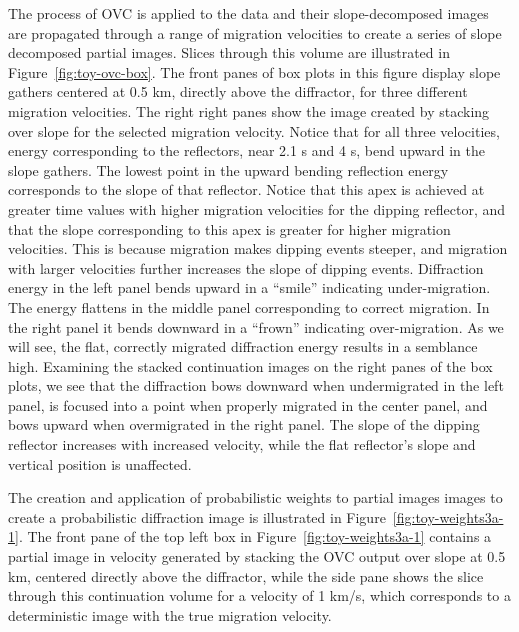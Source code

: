 The process of OVC is applied to the data and their slope-decomposed images are propagated through a range of migration velocities to create a series of slope decomposed partial images.
 Slices through this volume are illustrated in  Figure~\ref{fig:toy-ovc-box}. The front panes of box plots in this figure display slope gathers centered at 0.5 km, directly above the diffractor, for three different migration velocities.
The right right panes show the image created by stacking over slope for the selected migration velocity.   
Notice that for all three velocities, energy corresponding to the reflectors, near 2.1 s and 4 s, bend upward in the slope gathers.  The lowest point in the upward bending reflection energy corresponds to the slope of that reflector.  Notice that this apex is achieved at greater time values with higher migration velocities for the dipping reflector, and that the slope corresponding to this apex is greater for higher migration velocities.  This is because migration makes dipping events steeper, and migration with larger velocities further increases the slope of dipping events.  Diffraction energy in the left panel bends upward in a ``smile'' indicating under-migration.  The energy flattens in the middle panel corresponding to correct migration.  In the right panel it bends downward in a ``frown'' indicating over-migration.  As we will see, the flat, correctly migrated diffraction energy results in a semblance high.  Examining the stacked continuation images on the right panes of the box plots, we see that the diffraction bows downward when undermigrated in the left panel, is focused into a point when properly migrated in the center panel, and bows upward when overmigrated in the right panel.  The slope of the dipping reflector increases with increased velocity, while the flat reflector's slope and vertical position is unaffected.


The creation and application of probabilistic weights to partial images images to create a probabilistic diffraction image is illustrated in Figure~\ref{fig:toy-weights3a-1}.  The front pane of the top left box in Figure~\ref{fig:toy-weights3a-1} contains a partial image in velocity generated by stacking the OVC output over slope at 0.5 km, centered directly above the diffractor, while the side pane shows the slice through this continuation volume for a velocity of 1 km/s, 
which corresponds to a deterministic image with the true migration velocity.  


